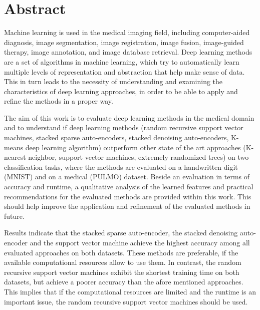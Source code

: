 

\chapter{Abstract}%
Machine learning is used in the medical imaging field, including computer-aided diagnosis, image
segmentation, image registration, image fusion, image-guided therapy, image annotation,
and image database retrieval. Deep learning methods are a set of algorithms in machine learning,
which try to automatically learn multiple levels of representation and abstraction that help
make sense of data. This in turn leads to the necessity of understanding and examining the characteristics
of deep learning approaches, in order to be able to apply and refine the methods in a
proper way.

The aim of this work is to evaluate deep learning methods in the medical domain and to
understand if deep learning methods (random recursive support vector machines, stacked sparse
auto-encoders, stacked denoising auto-encoders, K-means deep learning algorithm) outperform
other state of the art approaches (K-nearest neighbor, support vector machines, extremely randomized
trees) on two classification tasks, where the methods are evaluated on a handwritten
digit (MNIST) and on a medical (PULMO) dataset. Beside an evaluation in terms of accuracy
and runtime, a qualitative analysis of the learned features and practical recommendations for the
evaluated methods are provided within this work. This should help improve the application and
refinement of the evaluated methods in future.

Results indicate that the stacked sparse auto-encoder, the stacked denoising auto-encoder
and the support vector machine achieve the highest accuracy among all evaluated approaches on
both datasets. These methods are preferable, if the available computational resources allow to
use them. In contrast, the random recursive support vector machines exhibit the shortest training
time on both datasets, but achieve a poorer accuracy than the afore mentioned approaches. This
implies that if the computational resources are limited and the runtime is an important issue, the
random recursive support vector machines should be used.

